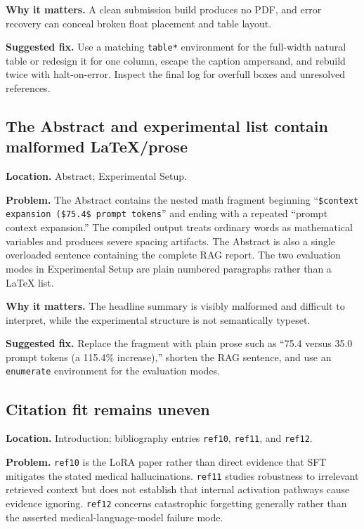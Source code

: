 \documentclass[11pt]{article}
\newcommand{\findinglabel}[1]{\textbf{#1}}
\begin{document}
\findinglabel{Why it matters.} A clean submission build produces no PDF, and error recovery can conceal broken float placement and table layout.

\findinglabel{Suggested fix.} Use a matching \texttt{table*} environment for the full-width natural table or redesign it for one column, escape the caption ampersand, and rebuild twice with halt-on-error.  Inspect the final log for overfull boxes and unresolved references.

\subsection*{The Abstract and experimental list contain malformed LaTeX/prose}

\findinglabel{Location.} Abstract; Experimental Setup.

\findinglabel{Problem.} The Abstract contains the nested math fragment beginning ``\texttt{\$context expansion (\$75.4\$ prompt tokens}'' and ending with a repeated ``prompt context expansion.''  The compiled output treats ordinary words as mathematical variables and produces severe spacing artifacts.  The Abstract is also a single overloaded sentence containing the complete RAG report.  The two evaluation modes in Experimental Setup are plain numbered paragraphs rather than a LaTeX list.

\findinglabel{Why it matters.} The headline summary is visibly malformed and difficult to interpret, while the experimental structure is not semantically typeset.

\findinglabel{Suggested fix.} Replace the fragment with plain prose such as ``75.4 versus 35.0 prompt tokens (a 115.4\% increase),'' shorten the RAG sentence, and use an \texttt{enumerate} environment for the evaluation modes.

\subsection*{Citation fit remains uneven}

\findinglabel{Location.} Introduction; bibliography entries \texttt{ref10}, \texttt{ref11}, and \texttt{ref12}.

\findinglabel{Problem.} \texttt{ref10} is the LoRA paper rather than direct evidence that SFT mitigates the stated medical hallucinations.  \texttt{ref11} studies robustness to irrelevant retrieved context but does not establish that internal activation pathways cause evidence ignoring.  \texttt{ref12} concerns catastrophic forgetting generally rather than the asserted medical-language-model failure mode.
\end{document}
